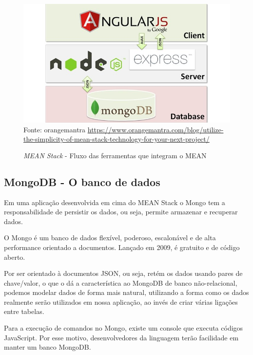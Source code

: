 \documentclass[
    article,            %
    11pt,               %
    oneside,            %
    a4paper,            %
    english,            %
    brazil,             %
    sumario=tradicional
    ]{abntex2}
\begin{document}
\begin{figure}[h]
	\centering

	\caption{\textit{MEAN Stack} - Fluxo das ferramentas que integram o MEAN} \label{fig:MEANStackFlow}
    \includegraphics[scale=0.4]{mean-stack-flow} \\
    Fonte: {orangemantra \url{https://www.orangemantra.com/blog/utilize-the-simplicity-of-mean-stack-technology-for-your-next-project/}}

\end{figure}

\subsection{MongoDB - O banco de dados}

Em uma aplicação desenvolvida em cima do MEAN Stack o Mongo tem a responsabilidade de persistir os dados, ou seja, permite armazenar e recuperar dados.

O Mongo é um banco de dados flexível, poderoso, escalonável e de alta performance orientado a documentos. Lançado em 2009, é gratuito e de código aberto.

Por ser orientado à documentos JSON, ou seja, retém os dados usando pares de chave/valor, o que o dá a característica ao MongoDB de banco não-relacional, podemos modelar dados de forma mais natural, utilizando a forma como os dados realmente serão utilizados em nossa aplicação, ao invés de criar várias ligações entre tabelas.

Para a execução de comandos no Mongo, existe um console que executa códigos JavaScript. Por esse motivo, desenvolvedores da linguagem terão facilidade em manter um banco MongoDB.
\end{document}
